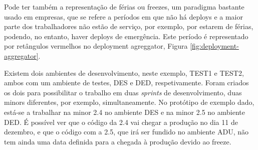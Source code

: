             Pode ter também a representação de férias ou freezes, um paradigma bastante usado em empresas, que se refere a períodos em que não há deploys e a maior parte dos trabalhadores não estão de serviço, por exemplo, por estarem de férias, podendo, no entanto, haver deploys de emergência. Este período é representado por retângulos vermelhos no deployment agreggator, Figura \ref{fig:deployment-aggregator}.
            
            Existem dois ambientes de desenvolvimento, neste exemplo, TEST1 e TEST2, ambos com um ambiente de testes, DES e DED, respetivamente. Foram criados os dois para possibilitar o trabalho em duas \textit{sprints} de desenvolvimento, duas minors diferentes, por exemplo, simultaneamente. No protótipo de exemplo dado, está-se a trabalhar na minor 2.4 no ambiente DES e na minor 2.5 no ambiente DED. É possível ver que o código da 2.4 vai chegar a produção no dia 11 de dezembro, e que o código com a 2.5, que irá ser fundido no ambiente ADU, não tem ainda uma data definida para a chegada à produção devido ao freeze.

